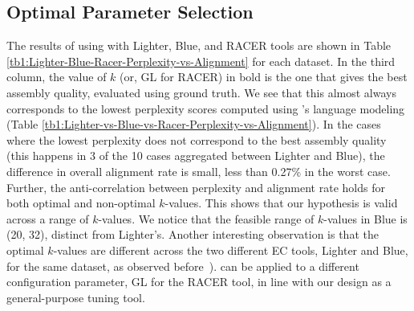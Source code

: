 \vspace{-12pt}
\subsection{Optimal Parameter Selection}
\vspace{-8pt}
The results of using \name with Lighter, Blue, and RACER tools are shown in Table \ref{tb1:Lighter-Blue-Racer-Perplexity-vs-Alignment} for each dataset. In the third column, the value of $k$ (or, GL for RACER) in bold is the one that gives the best assembly quality, evaluated using ground truth.
We see that this almost always corresponds to the lowest perplexity scores computed using \name's language modeling (Table \ref{tb1:Lighter-vs-Blue-vs-Racer-Perplexity-vs-Alignment}). %
In the cases where the lowest perplexity does not correspond to the best assembly quality (this happens in 3 of the 10 cases aggregated between Lighter and Blue), the difference in overall alignment rate is small, less than 0.27\% in the worst case.  
Further, the anti-correlation between perplexity and alignment rate holds for both optimal and non-optimal $k$-values. 
This shows that our hypothesis is valid across a range of $k$-values. We notice that the feasible range of $k$-values in Blue is (20, 32), distinct from Lighter's. Another interesting observation is that the optimal $k$-values are different across the two different EC tools, Lighter and Blue, for the same dataset, as observed before~\cite{song2014lighter}). 
\name can be applied to a different configuration parameter, GL for the RACER tool, in line with our design as a general-purpose tuning tool.

